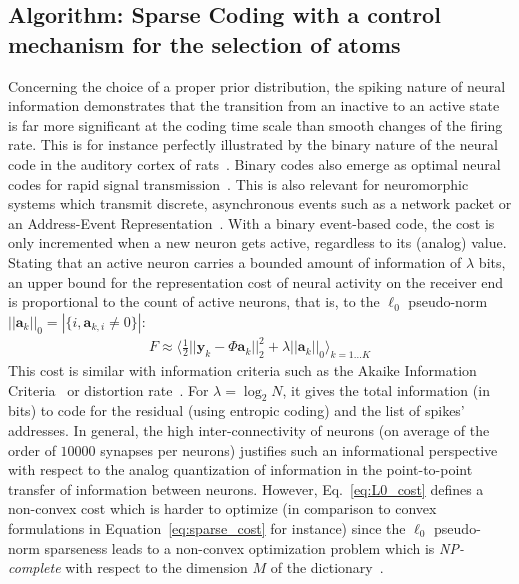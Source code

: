 \documentclass[vision,article,submit,oneauthor,pdftex]{Definitions/mdpi}
\newcommand{\coef}{\mathbf{a}} %
\newcommand{\image}{\mathbf{y}} %
\newcommand{\dico}{\Phi} %
\newcommand{\enscond}[2]{\lbrace #1, #2 \rbrace}
\newcommand{\norm}[1]{|\!| #1 |\!|}
\newcommand{\abs}[1]{\left|#1\right|}
\newcommand{\seeEq}[1]{Eq.~\ref{eq:#1}}%
\begin{document}
{\subsection{Algorithm: Sparse Coding with a control mechanism for the selection of atoms}
Concerning the choice of a proper prior distribution, the spiking nature of neural information demonstrates that the transition from an inactive to an active state is far more significant at the coding time scale than smooth changes of the firing rate. This is for instance perfectly illustrated by the binary nature of the neural code in the auditory cortex of rats~\citep{DeWeese03}. Binary codes also emerge as optimal neural codes for rapid signal transmission~\citep{Bethge03}. This is also relevant for neuromorphic systems which transmit discrete, asynchronous events such as a network packet or an Address-Event Representation~\citep{Khoei19}. With a binary event-based code, the cost is only incremented when a new neuron gets active, regardless to its (analog) value. Stating that an active neuron carries a bounded amount of information of $\lambda$ bits, an upper bound for the representation cost of neural activity on the receiver end is proportional to the count of active neurons, that is, to the $\ell_0$ pseudo-norm $\norm{\coef_{k}}_0 = \abs{\enscond{i}{\coef_{k, i} \neq 0}}$:%
\begin{align}%
F \approx   \langle \frac{1}{2} \norm{\image_k - \dico \coef_{k}}_2^2 + \lambda\norm{\coef_{k}}_0 \rangle_{k = 1 \ldots K}%
\label{eq:L0_cost}%
\end{align}%
This cost is similar with information criteria such as the Akaike Information Criteria~\citep{Akaike74} or distortion rate~\cite[p.~571]{Mallat98}. For $\lambda=\log_2 N$, it gives the total information (in bits) to code for the residual (using entropic coding) and the list of spikes' addresses. In general, the high inter-connectivity of neurons (on average of the order of $10000$ synapses per neurons) justifies such an informational perspective with respect to the analog quantization of information in the point-to-point transfer of information between neurons.
However, \seeEq{L0_cost} defines a non-convex cost which is harder to optimize (in comparison to convex formulations in Equation~\ref{eq:sparse_cost} for instance) since the $\ell_0$ pseudo-norm sparseness leads to a non-convex optimization problem which is \emph{NP-complete} with respect to the dimension $M$ of the dictionary~\cite[p.~418]{Mallat98}.
}
\end{document}

